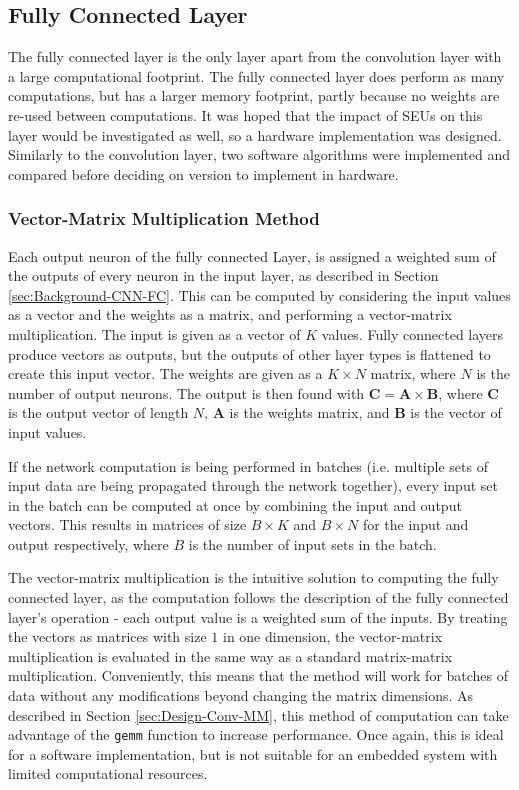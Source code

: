 \documentclass[12pt]{article}
\begin{document}
\subsection{Fully Connected Layer}
\label{sec:Design-FC}

The fully connected layer is the only layer apart from the convolution layer with a large computational footprint. The fully connected layer does	 perform as many computations, but has a larger memory footprint, partly because no weights are re-used between computations. It was hoped that the impact of SEUs on this layer would be investigated as well, so a hardware implementation was designed. Similarly to the convolution layer, two software algorithms were implemented and compared before deciding on  version to implement in hardware. 

\subsubsection{Vector-Matrix Multiplication Method}
\label{sec:Design-FC-MM}

Each output neuron of the fully connected Layer, is assigned a weighted sum of the outputs of every neuron in the input layer, as described in Section \ref{sec:Background-CNN-FC}. This can be computed by considering the input values as a vector and the weights as a matrix, and performing a vector-matrix multiplication. The input is given as a vector of $K$ values. Fully connected layers produce vectors as outputs, but the outputs of other layer types is flattened to create this input vector. The weights are given as a $K \times N$ matrix, where $N$ is the number of output neurons. The output is then found with \( \mathbf{C} = \mathbf{A}\times\mathbf{B}\), where $\mathbf{C}$ is the output vector of length $N$, $\mathbf{A}$ is the weights matrix, and $\mathbf{B}$ is the vector  of input values. 

If the network computation is being performed in batches (i.e. multiple sets of input data are being propagated through the network together), every input set in the batch can be computed at once by combining the input and output vectors. This results in matrices of size $B \times K$ and $B \times N$ for the input and output respectively, where $B$ is the number of input sets in the batch.

The vector-matrix multiplication is the intuitive solution to computing the fully connected layer, as the computation follows the description of the fully connected layer's operation - each output value is a weighted sum of the inputs. By treating the vectors as matrices with size $1$ in one dimension, the vector-matrix multiplication is evaluated in the same way as a standard matrix-matrix multiplication. Conveniently, this means that the method will work for batches of data without any modifications beyond changing the matrix dimensions. As described in Section \ref{sec:Design-Conv-MM}, this method of computation can take advantage of the \lstinline|gemm| function to increase performance. Once again, this is ideal for a software implementation, but is not suitable for an embedded system with limited computational resources.
\end{document}
